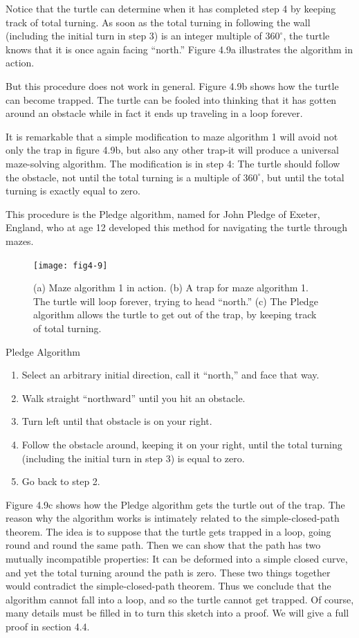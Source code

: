\documentclass{book}
\begin{document}
Notice that the turtle can determine when it has completed step 4 by
keeping track of total turning. As soon as the total turning in following
the wall (including the initial turn in step 3) is an integer multiple of
$360^{\circ}$, the turtle knows that it is once again facing ``north.'' Figure 4.9a
illustrates the algorithm in action.

But this procedure does not work in general. Figure 4.9b shows how
the turtle can become trapped. The turtle can be fooled into thinking
that it has gotten around an obstacle while in fact it ends up traveling
in a loop forever.

It is remarkable that a simple modification to maze algorithm 1 will
avoid not only the trap in figure 4.9b, but also any other trap-it will
produce a universal maze-solving algorithm. The modification is in step
4: The turtle should follow the obstacle, not until the total turning is a
multiple of $360^{\circ}$, but until the total turning is exactly equal to zero.

This
procedure is the Pledge algorithm, named for John Pledge of Exeter,
England, who at age 12 developed this method for navigating the turtle
through mazes.

\begin{figure}
\begin{center}
\texttt{[image: fig4-9]}
\caption{(a) Maze algorithm 1 in action. (b) A trap for maze algorithm 1. The turtle will loop forever, trying to head ``north.'' (c) The Pledge algorithm allows the turtle to get out of the trap, by keeping track of total turning.}
\end{center}
\end{figure}


Pledge Algorithm
\begin{enumerate}
\item Select an arbitrary initial direction, call it ``north,'' and face that
way.
\item Walk straight ``northward'' until you hit an obstacle.
\item Turn left until that obstacle is on your right.
\item Follow the obstacle around, keeping it on your right, until the total
turning (including the initial turn in step 3) is equal to zero.
\item Go back to step 2.
\end{enumerate}

Figure 4.9c shows how the Pledge algorithm gets the turtle out of
the trap. The reason why the algorithm works is intimately related to
the simple-closed-path theorem. The idea is to suppose that the turtle
gets trapped in a loop, going round and round the same path. Then
we can show that the path has two mutually incompatible properties: It
can be deformed into a simple closed curve, and yet the total turning
around the path is zero. These two things together would contradict
the simple-closed-path theorem. Thus we conclude that the algorithm
cannot fall into a loop, and so the turtle cannot get trapped. Of course,
many details must be filled in to turn this sketch into a proof. We will
give a full proof in section 4.4.
\end{document}
